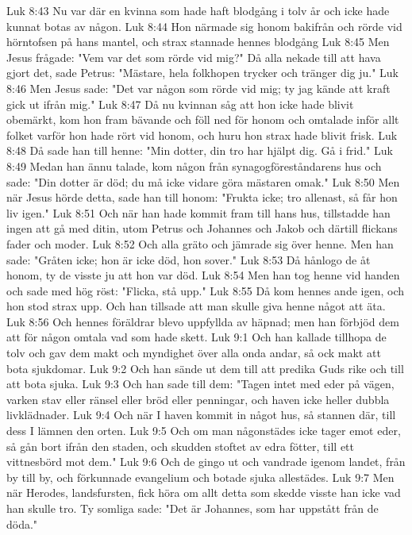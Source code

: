 Luk 8:43  Nu var där en kvinna som hade haft blodgång i tolv år och icke hade kunnat botas av någon.
Luk 8:44  Hon närmade sig honom bakifrån och rörde vid hörntofsen på hans mantel, och strax stannade hennes blodgång
Luk 8:45  Men Jesus frågade: "Vem var det som rörde vid mig?" Då alla nekade till att hava gjort det, sade Petrus: "Mästare, hela folkhopen trycker och tränger dig ju."
Luk 8:46  Men Jesus sade: "Det var någon som rörde vid mig; ty jag kände att kraft gick ut ifrån mig."
Luk 8:47  Då nu kvinnan såg att hon icke hade blivit obemärkt, kom hon fram bävande och föll ned för honom och omtalade inför allt folket varför hon hade rört vid honom, och huru hon strax hade blivit frisk.
Luk 8:48  Då sade han till henne: "Min dotter, din tro har hjälpt dig. Gå i frid."
Luk 8:49  Medan han ännu talade, kom någon från synagogföreståndarens hus och sade: "Din dotter är död; du må icke vidare göra mästaren omak."
Luk 8:50  Men när Jesus hörde detta, sade han till honom: "Frukta icke; tro allenast, så får hon liv igen."
Luk 8:51  Och när han hade kommit fram till hans hus, tillstadde han ingen att gå med ditin, utom Petrus och Johannes och Jakob och därtill flickans fader och moder.
Luk 8:52  Och alla gräto och jämrade sig över henne. Men han sade: "Gråten icke; hon är icke död, hon sover."
Luk 8:53  Då hånlogo de åt honom, ty de visste ju att hon var död.
Luk 8:54  Men han tog henne vid handen och sade med hög röst: "Flicka, stå upp."
Luk 8:55  Då kom hennes ande igen, och hon stod strax upp. Och han tillsade att man skulle giva henne något att äta.
Luk 8:56  Och hennes föräldrar blevo uppfyllda av häpnad; men han förbjöd dem att för någon omtala vad som hade skett.
Luk 9:1  Och han kallade tillhopa de tolv och gav dem makt och myndighet över alla onda andar, så ock makt att bota sjukdomar.
Luk 9:2  Och han sände ut dem till att predika Guds rike och till att bota sjuka.
Luk 9:3  Och han sade till dem: "Tagen intet med eder på vägen, varken stav eller ränsel eller bröd eller penningar, och haven icke heller dubbla livklädnader.
Luk 9:4  Och när I haven kommit in något hus, så stannen där, till dess I lämnen den orten.
Luk 9:5  Och om man någonstädes icke tager emot eder, så gån bort ifrån den staden, och skudden stoftet av edra fötter, till ett vittnesbörd mot dem."
Luk 9:6  Och de gingo ut och vandrade igenom landet, från by till by, och förkunnade evangelium och botade sjuka allestädes.
Luk 9:7  Men när Herodes, landsfursten, fick höra om allt detta som skedde visste han icke vad han skulle tro. Ty somliga sade: "Det är Johannes, som har uppstått från de döda."

